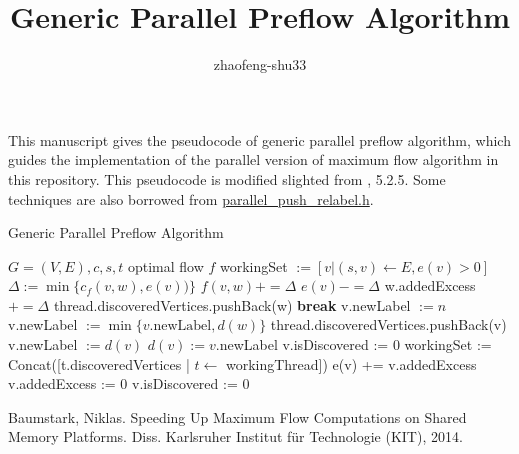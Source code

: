 \documentclass{article}
\title{Generic Parallel Preflow Algorithm}
\author{zhaofeng-shu33}
\begin{document}
\maketitle
This manuscript gives the pseudocode of generic parallel preflow algorithm, which guides the implementation of the parallel version
of maximum flow algorithm in this repository. This pseudocode is modified slighted from \cite{mf}, 5.2.5. Some techniques are also
borrowed from \href{https://github.com/Zagrosss/maxflow/blob/master/src/lib/algorithms/parallel/parallel_push_relabel.h}{parallel\_push\_relabel.h}.

\begin{algorithm}
\caption{Generic Parallel Preflow Algorithm}
\begin{algorithmic}[1]
\REQUIRE $G=(V,E),c,s,t$
\ENSURE optimal flow $f$
\STATE workingSet $:=[v | (s, v) \leftarrow E, e(v) > 0]$
\STATE $\Delta := \min\{c_f(v, w), e(v))\}$
\STATE $f(v, w) += \Delta$
\STATE $e(v) -= \Delta$
\STATE w.addedExcess $+= \Delta$
\STATE thread.discoveredVertices.pushBack(w)
\ENDIF
\ENDIF
{}
\STATE \textbf{break}
\ENDIF
\ENDFOR
\ENDFOR
{}
\STATE v.newLabel $:= n$
\STATE v.newLabel $:= \min\{v.\textrm{newLabel}, d(w)\}$
\ENDFOR
{}
\STATE thread.discoveredVertices.pushBack(v)
\ENDIF
\ELSE
\STATE v.newLabel $:= d(v)$
\ENDIF
\ENDFOR
{}
\STATE $d(v) :=v$.newLabel
\STATE v.isDiscovered := 0
\ENDFOR
\STATE workingSet := Concat([t.discoveredVertices | $t \leftarrow$ workingThread])
\STATE e(v) += v.addedExcess
\STATE v.addedExcess := 0
\STATE v.isDiscovered := 0
\ENDFOR
\ENDWHILE
\end{algorithmic}
\end{algorithm}

\begin{thebibliography}{9}
 Baumstark, Niklas. Speeding Up Maximum Flow Computations on Shared Memory Platforms. Diss. Karlsruher Institut für Technologie (KIT), 2014.
\end{thebibliography}
\end{document}
